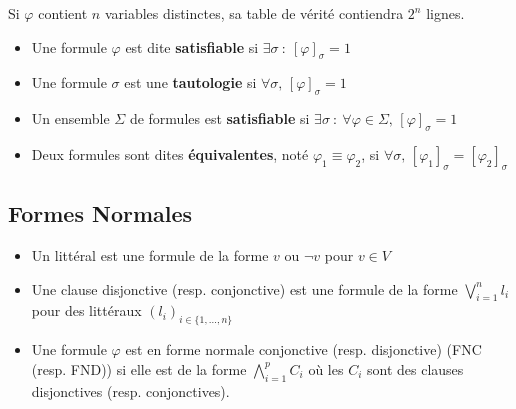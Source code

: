 \begin{rem}
	Si $\varphi$ contient $n$ variables distinctes, sa table de vérité contiendra $2^n$ lignes.
\end{rem}


\begin{definition}
	\begin{itemize}[label=$\star$]
		\item Une formule $\varphi$ est dite \textbf{satisfiable} si $\exists \sigma \: : \: [\varphi]_\sigma = 1$
		
		\item Une formule $\sigma$ est une \textbf{tautologie} si $\forall \sigma, \,[\varphi]_\sigma = 1$
		
		\item Un ensemble $\Sigma$ de formules est \textbf{satisfiable} si $\exists \sigma \: : \: \forall \varphi \in \Sigma, \, [\varphi]_\sigma = 1$
		
		\item Deux formules sont dites \textbf{équivalentes}, noté $\varphi_1 \equiv \varphi_2$, si $\forall \sigma, \, [\varphi_1]_\sigma = [\varphi_2]_\sigma$
	\end{itemize}
\end{definition}

\subsection{Formes Normales}

\begin{definition}
	\begin{itemize}[label=$\star$]
		\item Un littéral est une formule de la forme $v$ ou $\neg v$ pour $v \in V$
		
		\item Une clause disjonctive (resp. conjonctive) est une formule de la forme $\bigvee\limits_{i=1}^n l_i$ pour des littéraux $(l_i)_{i \in \{1, \dots, n\}}$
		
		\item Une formule $\varphi$ est en forme normale conjonctive (resp. disjonctive) (FNC (resp. FND)) si elle est de la forme $\bigwedge\limits_{i = 1}^p C_i$ où les $C_i$ sont des clauses disjonctives (resp. conjonctives).
	\end{itemize}
\end{definition}

